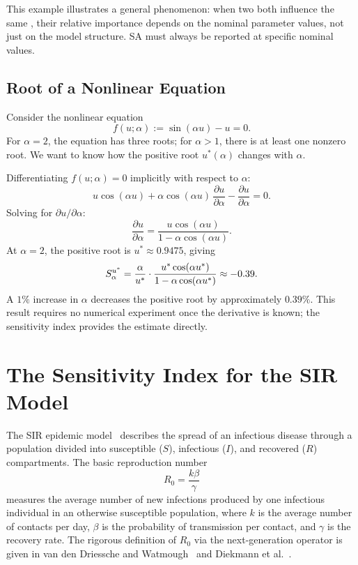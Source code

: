 This example illustrates a general phenomenon: when two \POIs
both influence the same \QOI, their relative importance
depends on the nominal parameter values, not just on the
model structure. SA must always be reported at specific
nominal values.

\subsection{Root of a Nonlinear Equation}
\label{subsec:nonlinear}

Consider the nonlinear equation
\[
  f(u;\alpha) := \sin(\alpha u) - u = 0.
\]
For $\alpha = 2$, the equation has three roots;
for $\alpha > 1$, there is at least one nonzero root.
We want to know how the positive root $u^*(\alpha)$ changes
with $\alpha$.

Differentiating $f(u;\alpha) = 0$ implicitly with respect to $\alpha$:
\[
  u\cos(\alpha u) + \alpha\cos(\alpha u)\,\frac{\partial u}{\partial\alpha}
  - \frac{\partial u}{\partial\alpha} = 0.
\]
Solving for $\partial u/\partial\alpha$:
\[
  \frac{\partial u}{\partial\alpha}
  = \frac{u\cos(\alpha u)}{1 - \alpha\cos(\alpha u)}.
\]
At $\alpha = 2$, the positive root is $u^* \approx 0.9475$, giving
\[
  S_{\alpha}^{u^*}
  = \frac{\alpha}{u^*}\cdot\frac{u^*\cos(\alpha u^*)}{1 - \alpha\cos(\alpha u^*)}
  \approx -0.39.
\]
A $1\%$ increase in $\alpha$ decreases the positive root by approximately $0.39\%$.
This result requires no numerical experiment once the derivative is known;
the sensitivity index provides the estimate directly.

\section{The Sensitivity Index for the SIR Model}
\label{sec:sirSI}

The SIR epidemic model~\cite{kermack1927contribution,anderson1991infectious} describes the spread of an infectious disease
through a population divided into susceptible ($S$), infectious ($I$),
and recovered ($R$) compartments.
The basic reproduction number
\[
  R_0 = \frac{k\beta}{\gamma}
\]
measures the average number of new infections produced by one
infectious individual in an otherwise susceptible population,
where $k$ is the average number of contacts per day, $\beta$ is
the probability of transmission per contact, and $\gamma$ is the
recovery rate. The rigorous definition of $R_0$ via the next-generation
operator is given in van den Driessche and Watmough~\cite{vandendriessche2002reproduction}
and Diekmann et al.~\cite{diekmann1990definition}.

